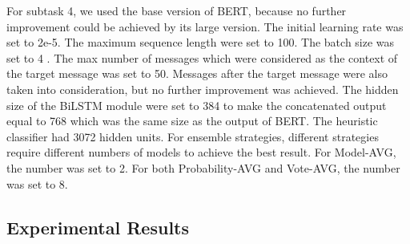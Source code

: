 \documentclass[letterpaper]{article} \usepackage{aaai20}  \usepackage{times}  \usepackage{helvet} \usepackage{courier}  \usepackage[hyphens]{url}  \usepackage{graphicx} \urlstyle{rm} \def\UrlFont{\rm}  \usepackage{graphicx}  \frenchspacing  \setlength{\pdfpagewidth}{8.5in}  \setlength{\pdfpageheight}{11in}
\begin{document}
    For subtask 4, we used the base version of BERT, because no further improvement could be achieved by its large version.
    The initial learning rate was set to 2e-5.
    The maximum sequence length were set to 100.
    The batch size was set to 4 .
    The max number of messages which were considered as the context of the target message was set to 50.
    Messages after the target message were also taken into consideration, but no further improvement was achieved.
    The hidden size of the BiLSTM module were set to 384 to make the concatenated output equal to 768 which was the same size as the output of BERT.
    The heuristic classifier had 3072 hidden units.
    For ensemble strategies, different strategies require different numbers of models to achieve the best result.
    For Model-AVG, the number was set to 2.
    For both Probability-AVG and Vote-AVG, the number was set to 8.



  \subsection{Experimental Results}
\end{document}
